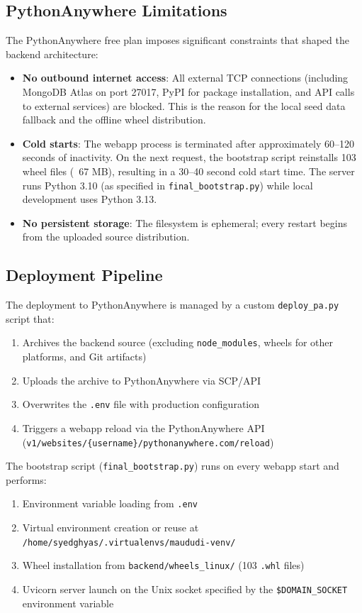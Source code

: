 \documentclass[11pt,a4paper]{article}
\begin{document}
\subsection{PythonAnywhere Limitations}

The PythonAnywhere free plan imposes significant constraints that shaped the backend architecture:

\begin{itemize}
    \item \textbf{No outbound internet access}: All external TCP connections (including MongoDB Atlas on port 27017, PyPI for package installation, and API calls to external services) are blocked. This is the reason for the local seed data fallback and the offline wheel distribution.
    \item \textbf{Cold starts}: The webapp process is terminated after approximately 60--120 seconds of inactivity. On the next request, the bootstrap script reinstalls 103 wheel files (~67 MB), resulting in a 30--40 second cold start time. The server runs Python 3.10 (as specified in \texttt{final\_bootstrap.py}) while local development uses Python 3.13.
    \item \textbf{No persistent storage}: The filesystem is ephemeral; every restart begins from the uploaded source distribution.
\end{itemize}

\subsection{Deployment Pipeline}

The deployment to PythonAnywhere is managed by a custom \texttt{deploy\_pa.py} script that:

\begin{enumerate}
    \item Archives the backend source (excluding \texttt{node\_modules}, wheels for other platforms, and Git artifacts)
    \item Uploads the archive to PythonAnywhere via SCP/API
    \item Overwrites the \texttt{.env} file with production configuration
    \item Triggers a webapp reload via the PythonAnywhere API (\texttt{v1/websites/\{username\}/pythonanywhere.com/reload})
\end{enumerate}

The bootstrap script (\texttt{final\_bootstrap.py}) runs on every webapp start and performs:
\begin{enumerate}
    \item Environment variable loading from \texttt{.env}
    \item Virtual environment creation or reuse at \texttt{/home/syedghyas/.virtualenvs/maududi-venv/}
    \item Wheel installation from \texttt{backend/wheels\_linux/} (103 \texttt{.whl} files)
    \item Uvicorn server launch on the Unix socket specified by the \texttt{\$DOMAIN\_SOCKET} environment variable
\end{enumerate}
\end{document}
